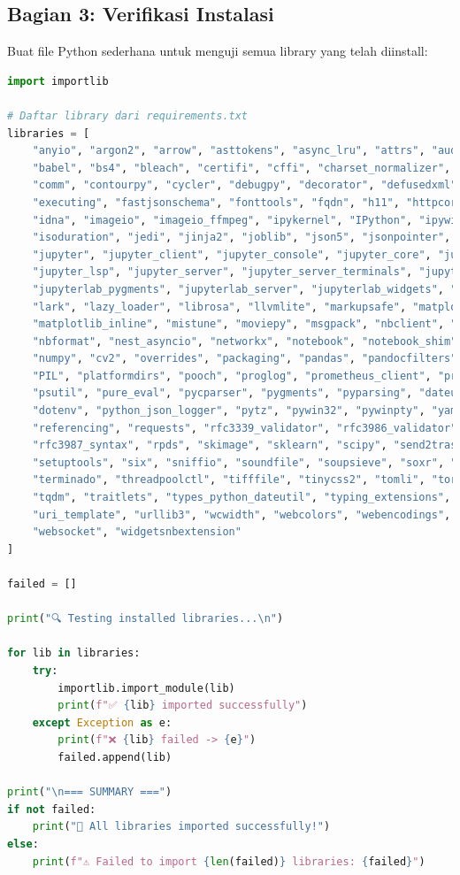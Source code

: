 \documentclass[11pt,a4paper]{article}
\begin{document}
\subsection{Bagian 3: Verifikasi Instalasi}
Buat file Python sederhana untuk menguji semua library yang telah diinstall:
\begin{lstlisting}[language=python, caption=Kode Python Sederhana untuk Cek library terinstall]
import importlib

# Daftar library dari requirements.txt
libraries = [
    "anyio", "argon2", "arrow", "asttokens", "async_lru", "attrs", "audioread",
    "babel", "bs4", "bleach", "certifi", "cffi", "charset_normalizer", "colorama",
    "comm", "contourpy", "cycler", "debugpy", "decorator", "defusedxml", "exceptiongroup",
    "executing", "fastjsonschema", "fonttools", "fqdn", "h11", "httpcore", "httpx",
    "idna", "imageio", "imageio_ffmpeg", "ipykernel", "IPython", "ipywidgets",
    "isoduration", "jedi", "jinja2", "joblib", "json5", "jsonpointer", "jsonschema",
    "jupyter", "jupyter_client", "jupyter_console", "jupyter_core", "jupyter_events",
    "jupyter_lsp", "jupyter_server", "jupyter_server_terminals", "jupyterlab",
    "jupyterlab_pygments", "jupyterlab_server", "jupyterlab_widgets", "kiwisolver",
    "lark", "lazy_loader", "librosa", "llvmlite", "markupsafe", "matplotlib",
    "matplotlib_inline", "mistune", "moviepy", "msgpack", "nbclient", "nbconvert",
    "nbformat", "nest_asyncio", "networkx", "notebook", "notebook_shim", "numba",
    "numpy", "cv2", "overrides", "packaging", "pandas", "pandocfilters", "parso",
    "PIL", "platformdirs", "pooch", "proglog", "prometheus_client", "prompt_toolkit",
    "psutil", "pure_eval", "pycparser", "pygments", "pyparsing", "dateutil",
    "dotenv", "python_json_logger", "pytz", "pywin32", "pywinpty", "yaml", "zmq",
    "referencing", "requests", "rfc3339_validator", "rfc3986_validator",
    "rfc3987_syntax", "rpds", "skimage", "sklearn", "scipy", "send2trash",
    "setuptools", "six", "sniffio", "soundfile", "soupsieve", "soxr", "stack_data",
    "terminado", "threadpoolctl", "tifffile", "tinycss2", "tomli", "tornado",
    "tqdm", "traitlets", "types_python_dateutil", "typing_extensions", "tzdata",
    "uri_template", "urllib3", "wcwidth", "webcolors", "webencodings",
    "websocket", "widgetsnbextension"
]

failed = []

print("🔍 Testing installed libraries...\n")

for lib in libraries:
    try:
        importlib.import_module(lib)
        print(f"✅ {lib} imported successfully")
    except Exception as e:
        print(f"❌ {lib} failed -> {e}")
        failed.append(lib)

print("\n=== SUMMARY ===")
if not failed:
    print("🎉 All libraries imported successfully!")
else:
    print(f"⚠️ Failed to import {len(failed)} libraries: {failed}")

\end{lstlisting}
\end{document}
